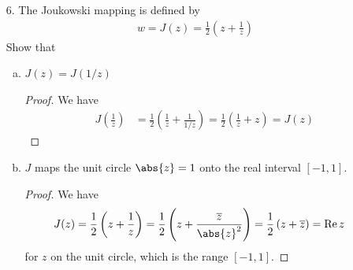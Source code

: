 \documentclass{article}
\DeclareMathOperator{\re}{Re}
\begin{document}
\begin{itemize}
	\item[6.] The Joukowski mapping is defined by
		\begin{align*}
			w=J(z) = \frac{1}{2}\left( z+\frac{1}{z} \right)
		\end{align*}
		Show that
		\begin{enumerate}[(a)]
			\item $J(z)=J(1/z)$
				\begin{proof}
					We have
					\begin{align*}
						J\left( \frac{1}{z} \right) &= \frac{1}{2} \left( \frac{1}{z} + \frac{1}{1/z} \right) = \frac{1}{2}\left( \frac{1}{z} + z \right) = J(z)
					\end{align*}
				\end{proof}

			\item $J$ maps the unit circle $\abs{z}=1$ onto the real interval $[-1, 1].$
				\begin{proof}
					We have
					\begin{align*}
						J(z) &= \frac{1}{2}\left( z+\frac{1}{z} \right) = \frac{1}{2} \left( z+\frac{\overline z}{\abs{z}^2} \right) = \frac{1}{2}\left( z+\overline z \right) = \re z
					\end{align*}
					for $z$ on the unit circle, which is the range $[-1, 1].$
				\end{proof}


\end{enumerate}
\end{itemize}
\end{document}
